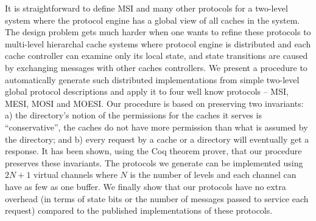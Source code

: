 

It is straightforward to define MSI and many other protocols for a two-level
system where the protocol engine has a global view of all caches in the system.
The design problem gets much harder when one wants to refine these protocols to
multi-level hierarchal cache systems where protocol engine is distributed and
each cache controller can examine only its local state, and state transitions
are caused by exchanging messages with other caches controllers. We present a
procedure to automatically generate such distributed implementations from simple
two-level global protocol descriptions and apply it to four well know protocols
– MSI, MESI, MOSI and MOESI. Our procedure is based on preserving two
invariants: a) the directory's notion of the permissions for the caches it
serves is ``conservative'', \ie the caches do not have more permission than what
is assumed by the directory; and b) every request by a cache or a directory will
eventually get a response. It has been shown, using the Coq theorem prover, that
our procedure preserves these invariants. The protocols we generate can be
implemented using $2N + 1$ virtual channels where $N$ is the number of levels
and each channel can have as few as one buffer. We finally show that our
protocols have no extra overhead (in terms of state bits or the number of
messages passed to service each request) compared to the published
implementations of these protocols. 

